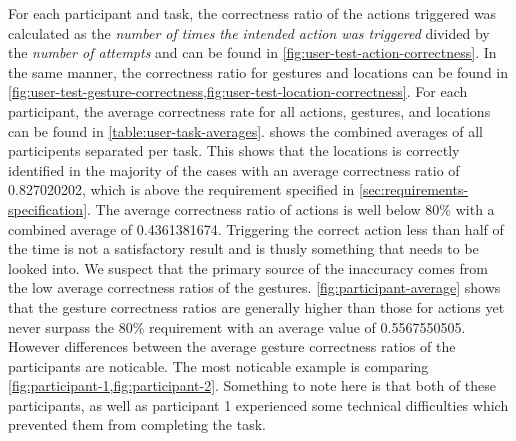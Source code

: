 For each participant and task, the correctness ratio of the actions triggered was calculated as the \emph{number of times the intended action was triggered} divided by the \emph{number of attempts} and can be found in \cref{fig:user-test-action-correctness}.
In the same manner, the correctness ratio for gestures and locations can be found in \cref{fig:user-test-gesture-correctness,fig:user-test-location-correctness}.
For each participant, the average correctness rate for all actions, gestures, and locations can be found in \cref{table:user-task-averages}.
 shows the combined averages of all participents separated per task.
This shows that the locations is correctly identified in the majority of the cases with an average correctness ratio of 0.827020202, which is above the requirement specified in \cref{sec:requirements-specification}.
The average correctness ratio of actions is well below 80\% with a combined average of 0.4361381674.
Triggering the correct action less than half of the time is not a satisfactory result and is thusly something that needs to be looked into.
We suspect that the primary source of the inaccuracy comes from the low average correctness ratios of the gestures.
\cref{fig:participant-average} shows that the gesture correctness ratios are generally higher than those for actions yet never surpass the 80\% requirement with an average value of 0.5567550505.
However differences between the average gesture correctness ratios of the participants are noticable.
The most noticable example is comparing \cref{fig:participant-1,fig:participant-2}.
Something to note here is that both of these participants, as well as participant 1 experienced some technical difficulties which prevented them from completing the task.

